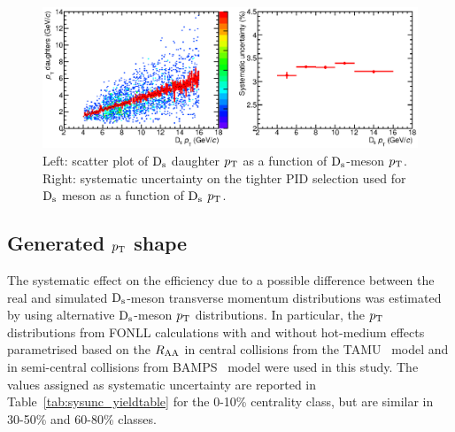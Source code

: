 \begin{figure}[!h]
 \centering
 \includegraphics[angle=0, width=13cm]{./FigCap5/PIDsystDs_MCall.eps}
 \caption{Left: scatter plot of ${\rm D_s}$ daughter $p_{\rm T}$ as a function of ${\rm D_s}$-meson $p_{\rm T}$. Right: systematic uncertainty on the tighter PID selection used for ${\rm D_s}$ meson as a function of ${\rm D_s}$ $p_{\rm T}$.}
 \label{fig:DsPIDsys} 
\end{figure}

\subsection{Generated $p_{\rm T}$ shape}
The systematic effect on the efficiency due to a possible difference between 
the real and simulated ${\rm D_s}$-meson transverse momentum distributions
was estimated by using alternative ${\rm D_s}$-meson $p_{\rm T}$ distributions.
In particular, the $p_{\rm T}$ distributions from FONLL calculations with
and without hot-medium effects parametrised based on the $R_{\rm AA}$ in central collisions from the 
TAMU~\cite{He:2014cla} model and in semi-central collisions from 
BAMPS~\cite{Uphoff:2014hza} model were used in this study.
The values assigned as systematic uncertainty are reported in 
Table~\ref{tab:sysunc_yieldtable} for the 0-10\% centrality class, but are similar in 
30-50\% and 60-80\% classes. 

